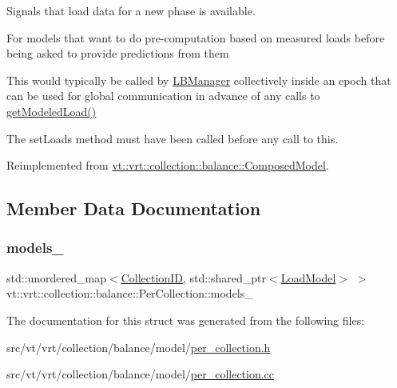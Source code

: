 Signals that load data for a new phase is available. 

For models that want to do pre-\/computation based on measured loads before being asked to provide predictions from them

This would typically be called by \hyperlink{structvt_1_1vrt_1_1collection_1_1balance_1_1_l_b_manager}{L\+B\+Manager} collectively inside an epoch that can be used for global communication in advance of any calls to \hyperlink{structvt_1_1vrt_1_1collection_1_1balance_1_1_per_collection_ad790d560d64515d28c6914f26fbe177c}{get\+Modeled\+Load()}

The {\ttfamily set\+Loads} method must have been called before any call to this. 

Reimplemented from \hyperlink{classvt_1_1vrt_1_1collection_1_1balance_1_1_composed_model_ad8108b4392d63b7f09e443920a64933a}{vt\+::vrt\+::collection\+::balance\+::\+Composed\+Model}.



\subsection{Member Data Documentation}
\mbox{\label{structvt_1_1vrt_1_1collection_1_1balance_1_1_per_collection_aec76660b4a44fe451a9546b4f4c50d3d}} 
\subsubsection{\texorpdfstring{models\+\_\+}{models\_}}
{\footnotesize\ttfamily std\+::unordered\+\_\+map$<$\hyperlink{structvt_1_1vrt_1_1collection_1_1balance_1_1_per_collection_ade08a6857f727a0a9d1ef63b25fc5b71}{Collection\+ID}, std\+::shared\+\_\+ptr$<$\hyperlink{structvt_1_1vrt_1_1collection_1_1balance_1_1_load_model}{Load\+Model}$>$ $>$ vt\+::vrt\+::collection\+::balance\+::\+Per\+Collection\+::models\+\_\+\hspace{0.3cm}{\ttfamily [private]}}



The documentation for this struct was generated from the following files\+:\begin{DoxyCompactItemize}
\item 
src/vt/vrt/collection/balance/model/\hyperlink{per__collection_8h}{per\+\_\+collection.\+h}\item 
src/vt/vrt/collection/balance/model/\hyperlink{per__collection_8cc}{per\+\_\+collection.\+cc}\end{DoxyCompactItemize}
